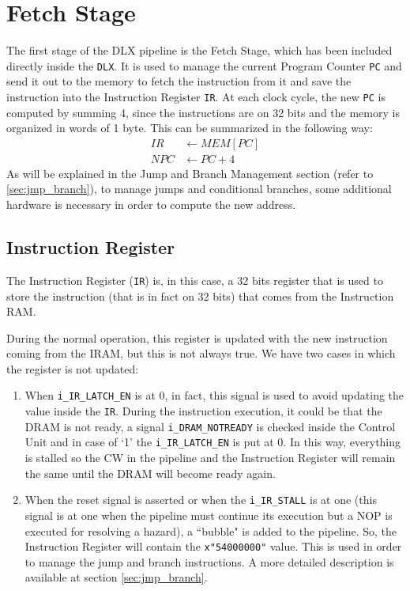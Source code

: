 \chapter{Fetch Stage}
The first stage of the DLX pipeline is the Fetch Stage, which has been included directly inside the \texttt{DLX}. It is used to manage the current Program Counter \texttt{PC} and send it out to the memory to fetch the instruction from it and save the instruction into the Instruction Register \texttt{IR}. At each clock cycle, the new \texttt{PC} is computed by summing 4, since the instructions are on 32 bits and the memory is organized in words of 1 byte. This can be summarized in the following way:
\begin{align*}
    IR &\leftarrow MEM[PC]\\
    NPC &\leftarrow PC + 4
\end{align*}
As will be explained in the Jump and Branch Management section (refer to \ref{sec:jmp_branch}), to manage jumps and conditional branches, some additional hardware is necessary in order to compute the new address.

\section{Instruction Register}
The Instruction Register (\texttt{IR}) is, in this case, a 32 bits register that is used to store the instruction (that is in fact on 32 bits) that comes from the Instruction RAM.

During the normal operation, this register is updated with the new instruction coming from the IRAM, but this is not always true. We have two cases in which the register is not updated:
\begin{enumerate}
    \item When \texttt{i\_IR\_LATCH\_EN} is at 0, in fact, this signal is used to avoid updating the value inside the \texttt{IR}. During the instruction execution, it could be that the DRAM is not ready, a signal \texttt{i\_DRAM\_NOTREADY} is checked inside the Control Unit and in case of `1' the \texttt{i\_IR\_LATCH\_EN} is put at 0. In this way, everything is stalled so the CW in the pipeline and the Instruction Register will remain the same until the DRAM will become ready again. 
    \item When the reset signal is asserted or when the \texttt{i\_IR\_STALL} is at one (this signal is at one when the pipeline must continue its execution but a NOP is executed for resolving a hazard), a ``bubble" is added to the pipeline. So, the Instruction Register will contain the \texttt{x"54000000"} value. This is used in order to manage the jump and branch instructions. A more detailed description is available at section \ref{sec:jmp_branch}.
\end{enumerate}

